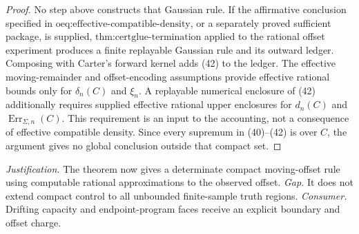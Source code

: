 \documentclass{article}
\begin{document}
\begin{proof}
No step above constructs that Gaussian rule.  If the affirmative conclusion specified in \(\text{oeq:effective-compatible-density}\), or a separately proved sufficient package, is supplied, \(\text{thm:certglue-termination}\) applied to the rational offset experiment produces a finite replayable Gaussian rule and its outward ledger.  Composing with Carter's forward kernel adds (42) to the ledger.  The effective moving-remainder and offset-encoding assumptions provide effective rational bounds only for \(\delta_n(C)\) and \(\xi_n\).  A replayable numerical enclosure of (42) additionally requires supplied effective rational upper enclosures for \(d_n(C)\) and \(\operatorname{Err}_{\Sigma,n}(C)\).  This requirement is an input to the accounting, not a consequence of effective compatible density.  Since every supremum in (40)--(42) is over \(C\), the argument gives no global conclusion outside that compact set.
\end{proof}
\par\smallskip\noindent \textit{Justification.} The theorem now gives a determinate compact moving-offset rule using computable rational approximations to the observed offset. \textit{Gap.} It does not extend compact control to all unbounded finite-sample truth regions. \textit{Consumer.} Drifting capacity and endpoint-program faces receive an explicit boundary and offset charge.
\end{document}
